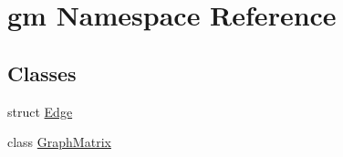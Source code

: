 \hypertarget{namespacegm}{}\section{gm Namespace Reference}
\label{namespacegm}
\subsection*{Classes}
\begin{DoxyCompactItemize}
\item 
struct \mbox{\hyperlink{structgm_1_1_edge}{Edge}}
\item 
class \mbox{\hyperlink{classgm_1_1_graph_matrix}{Graph\+Matrix}}
\end{DoxyCompactItemize}
